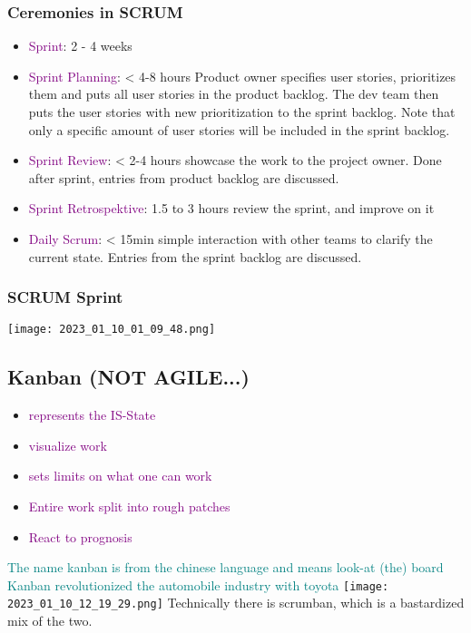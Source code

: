 \documentclass[main.tex,fontsize=12pt,paper=a4,paper=landscape,DIV=calc,]{scrartcl}
\begin{document}
\begin{multicols*}{2}
\subsubsection{Ceremonies in SCRUM}
\begin{itemize}
\item \textcolor{purple}{Sprint}: 2 - 4 weeks
\item \textcolor{purple}{Sprint Planning}: < 4-8 hours\newline
  Product owner specifies user stories, prioritizes them and puts all user stories in the product backlog.\newline
  The dev team then puts the user stories with new prioritization to the sprint backlog.\newline
  Note that only a specific amount of user stories will be included in the sprint backlog.
\item \textcolor{purple}{Sprint Review}: < 2-4 hours\newline
  showcase the work to the project owner. \newline
  Done after sprint, entries from product backlog are discussed.
\item \textcolor{purple}{Sprint Retrospektive}: 1.5 to 3 hours\newline
  review the sprint, and improve on it
\item \textcolor{purple}{Daily Scrum}: < 15min\newline
  simple interaction with other teams to clarify the current state.\newline
  Entries from the sprint backlog are discussed.
\end{itemize} 

\subsubsection{SCRUM Sprint}
\texttt{[image: 2023\_01\_10\_01\_09\_48.png]}

\subsection{Kanban (NOT AGILE...)}
\begin{itemize}
\item \textcolor{purple}{represents the IS-State}
\item \textcolor{purple}{visualize work}
\item \textcolor{purple}{sets limits on what one can work}
\item \textcolor{purple}{Entire work split into rough patches}
\item \textcolor{purple}{React to prognosis}
\end{itemize} 
\textcolor{teal}{The name kanban is from the chinese language and means look-at (the) board}\newline
\textcolor{teal}{Kanban revolutionized the automobile industry with toyota}\newline
\texttt{[image: 2023\_01\_10\_12\_19\_29.png]}\newline
Technically there is scrumban, which is a bastardized mix of the two.


\end{multicols*}
\end{document}
